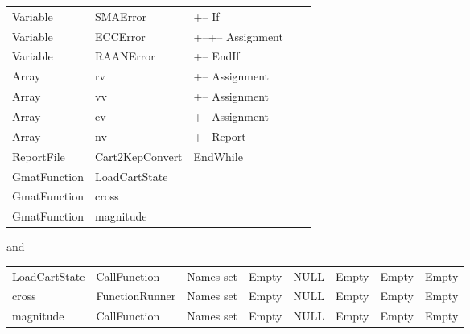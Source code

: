 \begin{center}
\begin{supertabular}{|l l|l|l|l|}
Variable & SMAError & +-- If & & \\
Variable & ECCError & +--+-- Assignment & & \\
Variable & RAANError & +-- EndIf & & \\
Array & rv & +-- Assignment & & \\
Array & vv & +-- Assignment & & \\
Array & ev & +-- Assignment & & \\
Array & nv & +-- Report & & \\
ReportFile & Cart2KepConvert & EndWhile & & \\
GmatFunction & LoadCartState & & & \\
GmatFunction & cross & & & \\
GmatFunction & magnitude & & & \\
\end{supertabular}
\end{center}

\noindent and

\begin{center}
\begin{small}
\tablelasttail{\hline}
\begin{supertabular}{|l|l|m{0.56in}|m{0.55in}|m{0.55in}|m{0.55in}|m{0.55in}|m{0.55in}|}
LoadCartState & CallFunction & Names set & Empty & NULL & Empty & Empty & Empty\\
cross & Function\-Runner & Names set & Empty & NULL & Empty & Empty & Empty\\
magnitude & CallFunction & Names set & Empty & NULL & Empty & Empty & Empty\\
\end{supertabular}
\end{small}
\end{center}

